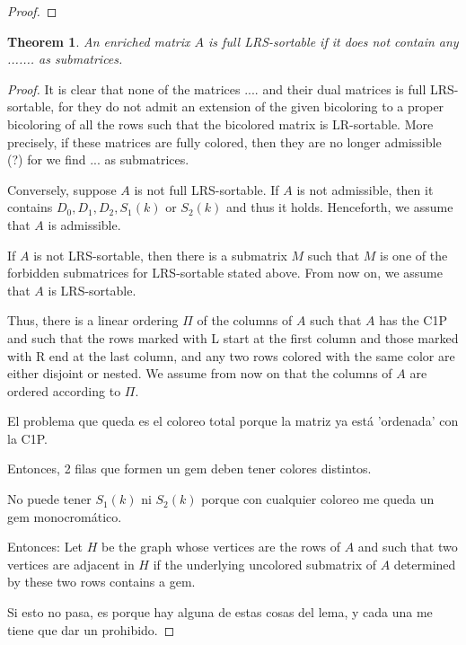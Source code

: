 \documentclass[a4paper,10pt]{report}
\theoremstyle{plain}
\newtheorem{teo}{Theorem}[chapter]
\theoremstyle{remark}
\theoremstyle{plain}
\begin{document}
{\begin{proof}
\end{proof}


\begin{teo}
	An enriched matrix $A$ is full LRS-sortable if it does not contain any ....... as submatrices.
\end{teo}

\begin{proof}

	It is clear that none of the matrices .... and their dual matrices is full LRS-sortable, for they do not admit an extension of the given bicoloring to a proper bicoloring of all the rows such that the bicolored matrix is LR-sortable. More precisely, if these matrices are fully colored, then they are no longer admissible (?) for we find ... as submatrices.
		
	Conversely, suppose $A$ is not full LRS-sortable. 
	If $A$ is not admissible, then it contains $D_0, D_1, D_2, S_1(k)$ or $S_2(k)$ and thus it holds.
	Henceforth, we assume that $A$ is admissible. 
	
	If $A$ is not LRS-sortable, then there is a submatrix $M$ such that $M$ is one of the forbidden submatrices for LRS-sortable stated above.
	From now on, we assume that $A$ is LRS-sortable. 
	
	Thus, there is a linear ordering $\Pi$ of the columns of $A$ such that $A$ has the C1P and such that the rows marked with L start at the first column and those marked with R end at the last column, and any two rows colored with the same color are either disjoint or nested. We assume from now on that the columns of $A$ are ordered according to $\Pi$.	
	

El problema que queda es el coloreo total porque la matriz ya está 'ordenada' con la C1P.

Entonces, 2 filas que formen un gem deben tener colores distintos. 

No puede tener $S_1(k)$ ni $S_2(k)$ porque con cualquier coloreo me queda un gem monocromático.

Entonces:
	Let $H$ be the graph whose vertices are the rows of $A$ and such that two vertices are adjacent in $H$ if the underlying uncolored submatrix of $A$ determined by these two rows contains a gem.
	
	Si esto no pasa, es porque hay alguna de estas cosas del lema, y cada una me tiene que dar un prohibido.	
	



\end{proof}}
\end{document}
